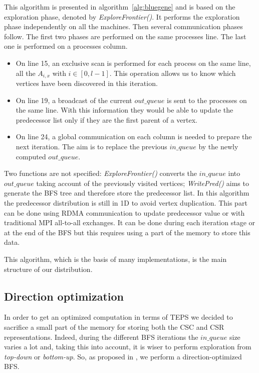 This algorithm is presented in algorithm~\ref{alg:bluegene} and is based on the exploration phase, denoted by \textit{ExploreFrontier()}. It performs the exploration phase independently on all the machines.
Then several communication phases follow. 
The first two phases are performed on the same processes line. The last one is performed on a processes column. 
\begin{itemize}
	\item On line 15, an exclusive scan is performed for each process on the same line, all the $A_{i,x}$ with $i \in [0,l-1]$. 
	This operation allows us to know which vertices have been discovered in this iteration.
	\item On line  19, a broadcast of the current $out\_queue$ is sent to the processes on the same line. With this information they would be able to update the predecessor list only if they are the first parent of a vertex.
	\item On line 24, a global communication on each column is needed to prepare the next iteration. 
	The aim is to replace the previous $in\_queue$ by the newly computed $out\_queue$.
\end{itemize}

Two functions are not specified: 
\textit{ExploreFrontier()} converts the $in\_queue$ into $out\_queue$ taking account of the previously visited vertices;
\textit{WritePred()} aims to generate the BFS tree and therefore store the predecessor list. In this algorithm the predecessor distribution is still in 1D to avoid vertex duplication. 
	This part can be done using RDMA communication to update predecessor value or with traditional MPI all-to-all exchanges.
	It can be done during each iteration stage or at the end of the BFS but this requires using a part of the memory to store this data. 

This algorithm, which is the basis of many implementations, is the main structure of our distribution. 

\subsection{Direction optimization}

In order to get an optimized computation in terms of TEPS we decided to sacrifice a small part of the memory for storing both the CSC and CSR representations. 
Indeed, during the different BFS iterations the $in\_queue$ size varies a lot and, taking this into account, it is wiser to perform exploration from \textit{top-down} or \textit{bottom-up}. 
So, as proposed in \cite{beamer2013direction}, we perform a direction-optimized BFS.

